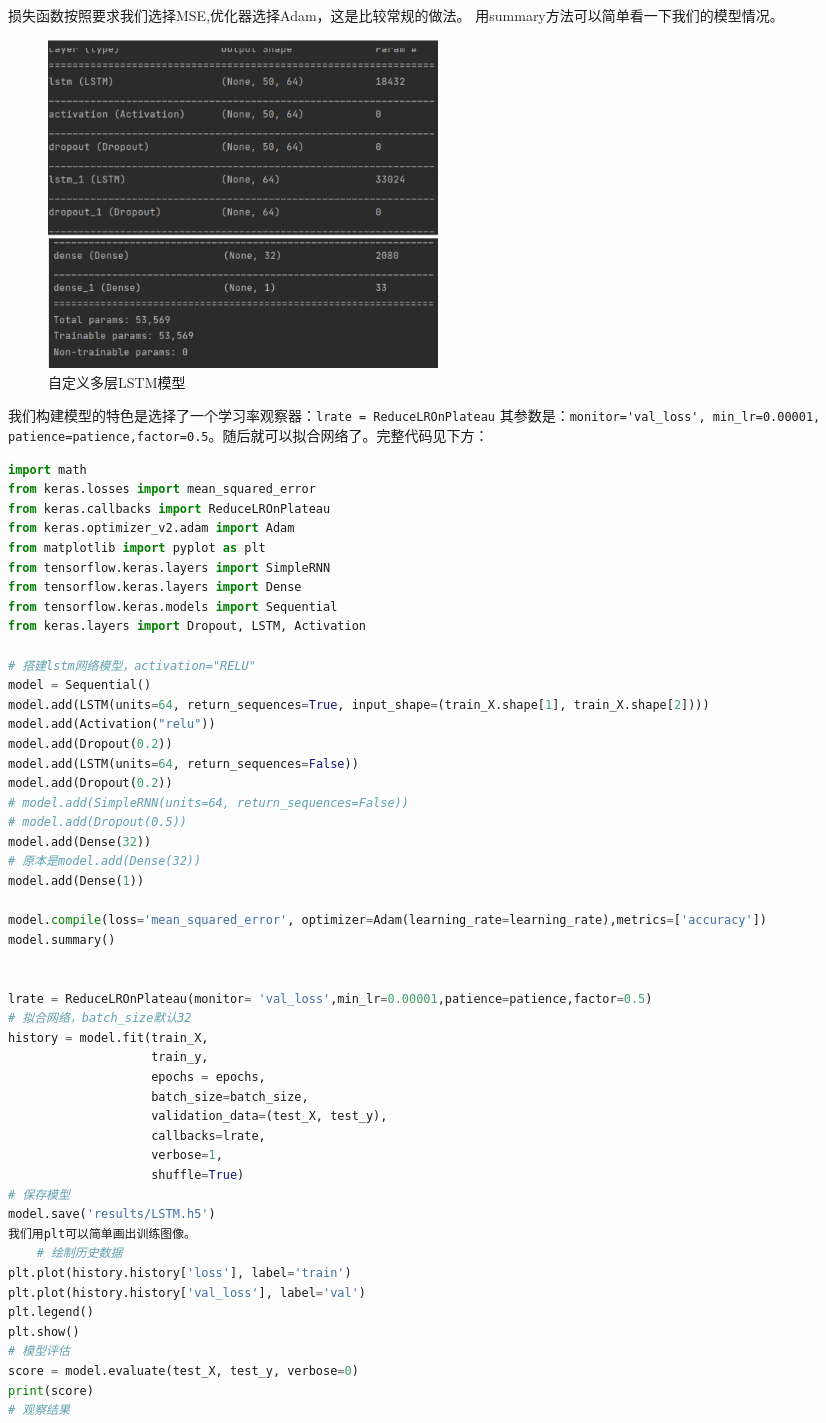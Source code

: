 \documentclass[11pt,a4paper]{elegantpaper}
\begin{document}
\begin{multicols}{2}
损失函数按照要求我们选择MSE,优化器选择Adam，这是比较常规的做法。
用summary方法可以简单看一下我们的模型情况。


\begin{figure}[H]
  \centering
  \includegraphics[width=0.5\textwidth]{images/FGNB.png}
  \caption{自定义多层LSTM模型} 
\end{figure}

我们构建模型的特色是选择了一个学习率观察器：\lstinline{lrate = ReduceLROnPlateau}
其参数是：\lstinline{monitor='val_loss', min_lr=0.00001, patience=patience,factor=0.5}。随后就可以拟合网络了。完整代码见下方：

\begin{lstlisting}[language=Python]
import math
from keras.losses import mean_squared_error
from keras.callbacks import ReduceLROnPlateau
from keras.optimizer_v2.adam import Adam
from matplotlib import pyplot as plt
from tensorflow.keras.layers import SimpleRNN
from tensorflow.keras.layers import Dense
from tensorflow.keras.models import Sequential
from keras.layers import Dropout, LSTM, Activation

# 搭建lstm网络模型，activation="RELU"
model = Sequential()
model.add(LSTM(units=64, return_sequences=True, input_shape=(train_X.shape[1], train_X.shape[2])))
model.add(Activation("relu"))
model.add(Dropout(0.2))
model.add(LSTM(units=64, return_sequences=False))
model.add(Dropout(0.2))
# model.add(SimpleRNN(units=64, return_sequences=False))
# model.add(Dropout(0.5))
model.add(Dense(32))
# 原本是model.add(Dense(32))
model.add(Dense(1))

model.compile(loss='mean_squared_error', optimizer=Adam(learning_rate=learning_rate),metrics=['accuracy'])
model.summary()


lrate = ReduceLROnPlateau(monitor= 'val_loss',min_lr=0.00001,patience=patience,factor=0.5)
# 拟合网络，batch_size默认32
history = model.fit(train_X,
                    train_y,
                    epochs = epochs,
                    batch_size=batch_size,
                    validation_data=(test_X, test_y),
                    callbacks=lrate,
                    verbose=1,
                    shuffle=True)
# 保存模型
model.save('results/LSTM.h5')
我们用plt可以简单画出训练图像。
	# 绘制历史数据
plt.plot(history.history['loss'], label='train')
plt.plot(history.history['val_loss'], label='val')
plt.legend()
plt.show()
# 模型评估
score = model.evaluate(test_X, test_y, verbose=0)
print(score)
# 观察结果
\end{lstlisting}


\end{multicols}
\end{document}

